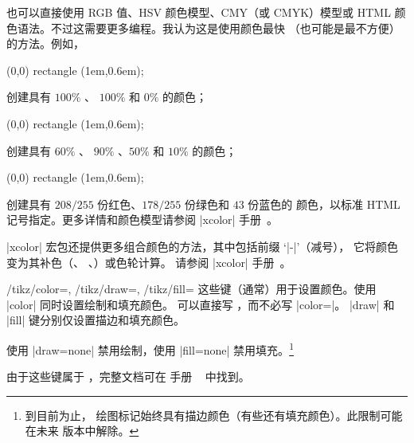 {也可以直接使用 RGB 值、HSV 颜色模型、CMY（或 CMYK）模型或
HTML 颜色语法。不过这需要更多编程。我认为这是使用颜色最快
（也可能是最不方便）的方法。例如，
%
\begin{codeexample}[]
\tikz \fill[color1]
    (0,0) rectangle (1em,0.6em);
\end{codeexample}
%
\noindent 创建具有 $100\%$ 、
$100\%$  和 $0\%$ 
的颜色；
%
\begin{codeexample}[]
\tikz \fill[color1]
    (0,0) rectangle (1em,0.6em);
\end{codeexample}
%
\noindent 创建具有 $60\%$ 、
$90\%$ 、$50\%$ 
和 $10\%$  的颜色；

\begin{codeexample}[]
\tikz \fill[color1]
    (0,0) rectangle (1em,0.6em);
\end{codeexample}
%
\noindent 创建具有 $208/255$ 份红色、$178/255$ 份绿色和 $43$ 份蓝色的
颜色，以标准 HTML 记号指定。更多详情和颜色模型请参阅
|xcolor| 手册~\cite{xcolor}。

|xcolor| 宏包还提供更多组合颜色的方法，其中包括前缀 `|-|'（减号），
它将颜色变为其补色（、
、）或色轮计算。
请参阅 |xcolor| 手册~\cite{xcolor}。
}%

\begin{keylist}{
    /tikz/color=,
    /tikz/draw=,
    /tikz/fill=%
}
    这些键（通常）用于设置颜色。使用 |color| 同时设置绘制和填充颜色。
    可以直接写 ，而不必写 |color=|。
    |draw| 和 |fill| 键分别仅设置描边和填充颜色。

    使用 |draw=none| 禁用绘制，使用 |fill=none| 禁用填充。\footnote{到目前为止，
    绘图标记始终具有描边颜色（有些还有填充颜色）。此限制可能在未来
    版本中解除。}

    由于这些键属于 \Tikz{}，完整文档可在 \Tikz{} 手册
    ~\cite[Section ``Specifying a Color'']{tikz} 中找到。
\end{keylist}


